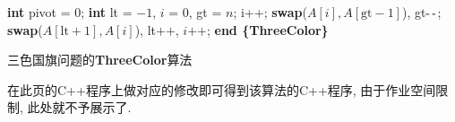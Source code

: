 \documentclass{article}
\begin{document}
\begin{homeworkProblem}
\begin{algorithm}[H]
	\begin{algorithmic}[1]
	\State \textbf{int} pivot = 0;
	\State \textbf{int} lt = $-1$, $i$ = 0, gt = $n$;
			\State i++;
			\State \textbf{swap}($A[i],A[\text{gt}-1]$), gt$\text{-\,-}$;
			\State \textbf{swap}($A[\text{lt}+1],A[i]$), lt$\text{++}$, $i\text{++}$;
		\EndIf
	\EndWhile
	\State \textbf{end \{ThreeColor\}}
	\end{algorithmic}
	\caption{三色国旗问题的\textbf{ThreeColor}算法}
	\label{alg:三色国旗算法}
\end{algorithm}
在此页的C++程序上做对应的修改即可得到该算法的C++程序, 由于作业空间限制, 此处就不予展示了.

\end{homeworkProblem}
\end{document}
